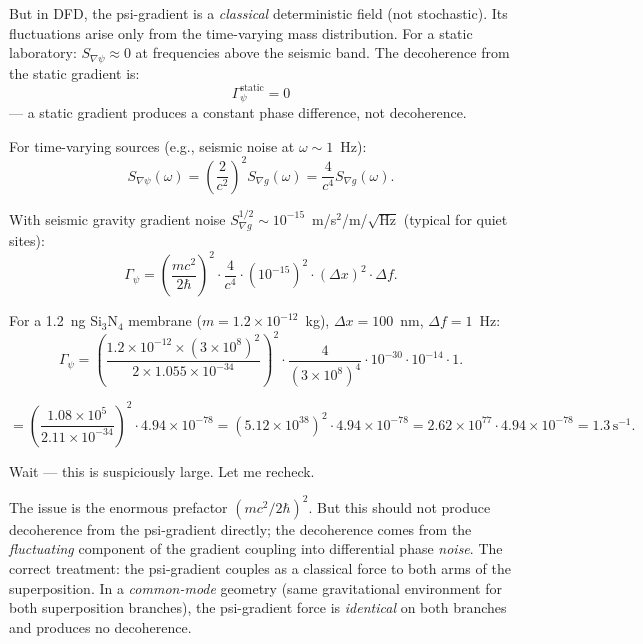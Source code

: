 \documentclass[11pt]{article}
\theoremstyle{definition}
\theoremstyle{remark}
\newcommand{\ee}[1]{\times10^{#1}}
\begin{document}
But in DFD, the psi-gradient is a \emph{classical} deterministic
field (not stochastic). Its fluctuations arise only from the
time-varying mass distribution. For a static laboratory:
$S_{\nabla\psi} \approx 0$ at frequencies above the seismic band.
The decoherence from the static gradient is:
\begin{equation}
\Gamma_\psi^{\mathrm{static}} = 0
\end{equation}
--- a static gradient produces a constant phase difference, not
decoherence.

For time-varying sources (e.g., seismic noise at $\omega \sim 1$~Hz):
\begin{equation}
S_{\nabla\psi}(\omega) = \left(\frac{2}{c^2}\right)^2 S_{\nabla g}(\omega)
= \frac{4}{c^4} S_{\nabla g}(\omega).
\end{equation}

With seismic gravity gradient noise
$S_{\nabla g}^{1/2} \sim 10^{-15}$~m/s$^2$/m/$\sqrt{\mathrm{Hz}}$
(typical for quiet sites):
\begin{equation}
\Gamma_\psi = \left(\frac{mc^2}{2\hbar}\right)^2
\cdot \frac{4}{c^4} \cdot (10^{-15})^2 \cdot (\Delta x)^2 \cdot \Delta f.
\end{equation}

For a 1.2~ng Si$_3$N$_4$ membrane ($m = 1.2\ee{-12}$~kg),
$\Delta x = 100$~nm, $\Delta f = 1$~Hz:
\begin{equation}
\Gamma_\psi = \left(\frac{1.2\ee{-12} \times (3\ee{8})^2}{2 \times 1.055\ee{-34}}\right)^2
\cdot \frac{4}{(3\ee{8})^4} \cdot 10^{-30} \cdot 10^{-14} \cdot 1.
\end{equation}

\begin{equation}
= \left(\frac{1.08\ee{5}}{2.11\ee{-34}}\right)^2 \cdot 4.94\ee{-78}
= (5.12\ee{38})^2 \cdot 4.94\ee{-78}
= 2.62\ee{77} \cdot 4.94\ee{-78}
= 1.3\,\mathrm{s}^{-1}.
\end{equation}

Wait --- this is suspiciously large. Let me recheck.

The issue is the enormous prefactor $(mc^2/2\hbar)^2$.
But this should not produce decoherence from the psi-gradient
directly; the decoherence comes from the \emph{fluctuating}
component of the gradient coupling into differential phase
\emph{noise}. The correct treatment: the psi-gradient couples
as a classical force to both arms of the superposition. In a
\emph{common-mode} geometry (same gravitational environment for
both superposition branches), the psi-gradient force is
\emph{identical} on both branches and produces no decoherence.
\end{document}
